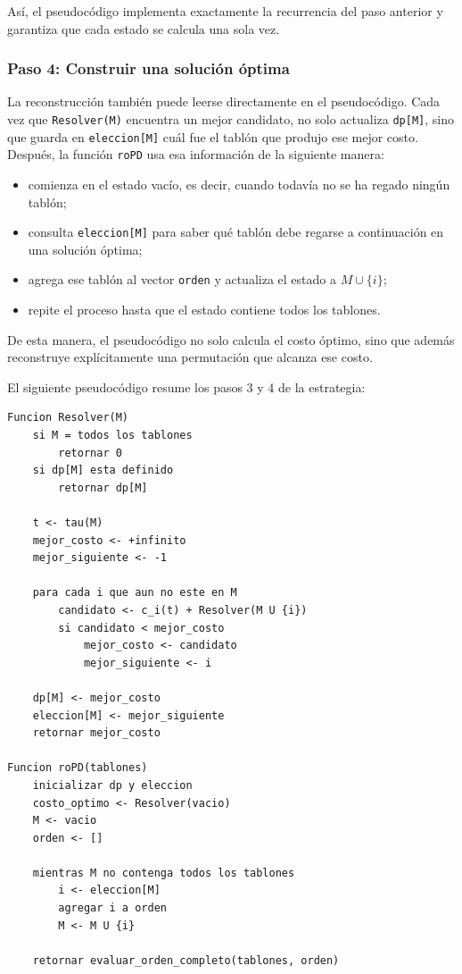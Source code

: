 \documentclass[12pt,a4paper]{article}
\begin{document}
As\'i, el pseudoc\'odigo implementa exactamente la recurrencia del paso anterior y garantiza que cada estado se calcula una sola vez.

\subsubsection{Paso 4: Construir una soluci\'on \'optima}

La reconstrucci\'on tambi\'en puede leerse directamente en el pseudoc\'odigo. Cada vez que \texttt{Resolver(M)} encuentra un mejor candidato, no solo actualiza \texttt{dp[M]}, sino que guarda en \texttt{eleccion[M]} cu\'al fue el tabl\'on que produjo ese mejor costo. Despu\'es, la funci\'on \texttt{roPD} usa esa informaci\'on de la siguiente manera:
\begin{itemize}
  \item comienza en el estado vac\'io, es decir, cuando todav\'ia no se ha regado ning\'un tabl\'on;
  \item consulta \texttt{eleccion[M]} para saber qu\'e tabl\'on debe regarse a continuaci\'on en una soluci\'on \'optima;
  \item agrega ese tabl\'on al vector \texttt{orden} y actualiza el estado a \(M \cup \{i\}\);
  \item repite el proceso hasta que el estado contiene todos los tablones.
\end{itemize}

De esta manera, el pseudoc\'odigo no solo calcula el costo \'optimo, sino que adem\'as reconstruye expl\'icitamente una permutaci\'on que alcanza ese costo.

El siguiente pseudoc\'odigo resume los pasos 3 y 4 de la estrategia:

\begin{center}
\begin{minipage}{0.92\textwidth}
\begin{lstlisting}[style=pseudobloque]
Funcion Resolver(M)
    si M = todos los tablones
        retornar 0
    si dp[M] esta definido
        retornar dp[M]

    t <- tau(M)
    mejor_costo <- +infinito
    mejor_siguiente <- -1

    para cada i que aun no este en M
        candidato <- c_i(t) + Resolver(M U {i})
        si candidato < mejor_costo
            mejor_costo <- candidato
            mejor_siguiente <- i

    dp[M] <- mejor_costo
    eleccion[M] <- mejor_siguiente
    retornar mejor_costo

Funcion roPD(tablones)
    inicializar dp y eleccion
    costo_optimo <- Resolver(vacio)
    M <- vacio
    orden <- []

    mientras M no contenga todos los tablones
        i <- eleccion[M]
        agregar i a orden
        M <- M U {i}

    retornar evaluar_orden_completo(tablones, orden)
\end{lstlisting}
\end{minipage}
\end{center}
\end{document}
